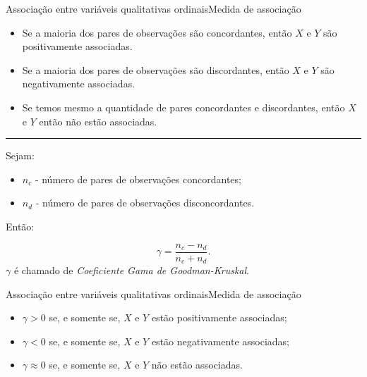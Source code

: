 \documentclass[
  10pt,
  ignorenonframetext,
]{beamer}
\providecommand{\tightlist}{%
  \setlength{\itemsep}{0pt}\setlength{\parskip}{0pt}}\usepackage{longtable,booktabs,array}
\newcommand*{\regrafina}{\rule{\textwidth}{0.5pt}}
\begin{document}
\begin{frame}{Associação entre variáveis qualitativas
ordinais\newline Medida de associação}
\protect\hypertarget{associauxe7uxe3o-entre-variuxe1veis-qualitativas-ordinaismedida-de-associauxe7uxe3o-1}{}
\begin{itemize}
\tightlist
\item
  Se a maioria dos pares de observações são concordantes, então \(X\) e
  \(Y\) são positivamente associadas.
\item
  Se a maioria dos pares de observações são discordantes, então \(X\) e
  \(Y\) são negativamente associadas.
\item
  Se temos mesmo a quantidade de pares concordantes e discordantes,
  então \(X\) e \(Y\) então não estão associadas.
\end{itemize}

\regrafina

Sejam:

\begin{itemize}
\tightlist
\item
  \(n_c\) - número de pares de observações concordantes;
\item
  \(n_d\) - número de pares de observações disconcordantes.
\end{itemize}

Então:

\[
\gamma = \frac{n_c - n_d}{n_c + n_d}.
\] \(\gamma\) é chamado de \emph{Coeficiente Gama de Goodman-Kruskal}.
\end{frame}

\begin{frame}{Associação entre variáveis qualitativas
ordinais\newline Medida de associação}
\protect\hypertarget{associauxe7uxe3o-entre-variuxe1veis-qualitativas-ordinaismedida-de-associauxe7uxe3o-2}{}
\begin{itemize}
\tightlist
\item
  \(\gamma >0\) se, e somente se, \(X\) e \(Y\) estão positivamente
  associadas;
\item
  \(\gamma <0\) se, e somente se, \(X\) e \(Y\) estão negativamente
  associadas;
\item
  \(\gamma \approx 0\) se, e somente se, \(X\) e \(Y\) não estão
  associadas.
\end{itemize}
\end{frame}
\end{document}
